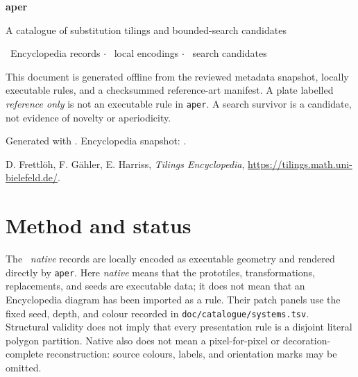 \documentclass[10pt]{article}
\begin{document}
\begin{titlepage}
  \thispagestyle{empty}
  \vspace*{0.11\textheight}
  {\Huge\bfseries\color{aperink} aper\par}
  \vspace{0.6em}
  {\LARGE A catalogue of substitution tilings and bounded-search candidates\par}
  \vspace{1.5em}
  {\large
    \CatalogueBankCount\ Encyclopedia records
    \quad$\cdot$\quad
    \CatalogueNativeCount\ local encodings
    \quad$\cdot$\quad
    \CatalogueCandidateCount\ search candidates\par
  }
  \vfill
  \begin{minipage}{0.82\textwidth}
    This document is generated offline from the reviewed metadata snapshot,
    locally executable rules, and a checksummed reference-art manifest. A
    plate labelled \emph{reference only} is not an executable rule in
    \texttt{aper}. A search survivor is a candidate, not evidence of novelty
    or aperiodicity.

    \medskip
    Generated with \texttt{\CatalogueAperVersion}. Encyclopedia snapshot:
    \CatalogueSnapshotDate.
  \end{minipage}
  \vfill
  {\small\color{apergrey}
    D. Frettlöh, F. Gähler, E. Harriss,
    \emph{Tilings Encyclopedia},
    \url{https://tilings.math.uni-bielefeld.de/}.\par
  }
\end{titlepage}

\section*{Method and status}

The \CatalogueNativeCount\ \emph{native} records are locally encoded as
executable geometry and rendered directly by \texttt{aper}.
Here \emph{native} means that the prototiles, transformations, replacements,
and seeds are executable data; it does not mean that an Encyclopedia diagram
has been imported as a rule. Their patch panels use the fixed seed, depth, and
colour recorded in \texttt{doc/catalogue/systems.tsv}. Structural validity
does not imply that every presentation rule is a disjoint literal polygon
partition. Native also does not mean a pixel-for-pixel or decoration-complete
reconstruction: source colours, labels, and orientation marks may be omitted.
\end{document}
